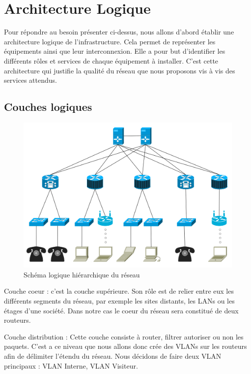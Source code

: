 \section{Architecture Logique}

Pour répondre au besoin présenter ci-dessus, nous allons d'abord établir une architecture logique de l'infrastructure.
Cela permet de représenter les équipements ainsi que leur interconnexion.
Elle a pour but d'identifier les différents rôles et services de chaque équipement à installer.
C'est cette architecture qui justifie la qualité du réseau que nous proposons vis à vis des services attendus.

%
%
\subsection{Couches logiques}

\begin{figure}[!ht]
    \center
    \includegraphics[width=1\textwidth]{./images/schema-logique.png}
    \caption{Schéma logique hiérarchique du réseau}
\end{figure}

%
    \cleardoublepage
%

Couche coeur :
c'est la couche supérieure.
Son rôle est de relier entre eux les différents segments du réseau, par exemple les sites distants, les LANs ou les étages d'une société.
Dans notre cas le coeur du réseau sera constitué de deux routeurs.

Couche distribution :
Cette couche consiste à router, filtrer autoriser ou non les paquets.
C'est a ce niveau que nous allons donc crée des VLANs sur les routeurs afin de délimiter l'étendu du réseau.
Nous décidons de faire deux VLAN principaux : VLAN Interne, VLAN Visiteur.

